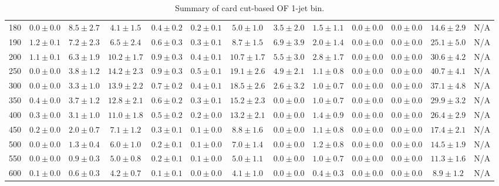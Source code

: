 \begin{table}
{\begin{center}
\begin{tabular}{l | c c | c c c c c c c c  | c c}
180 & $0.0\pm0.0$ & $8.5\pm2.7$ & $4.1\pm1.5$ & $0.4\pm0.2$ & $0.2\pm0.1$ & $5.0\pm1.0$ & $3.5\pm2.0$ & $1.5\pm1.1$ & $0.0\pm0.0$ & $0.0\pm0.0$ & $14.6\pm2.9$ & N/A \\
190 & $1.2\pm0.1$ & $7.2\pm2.3$ & $6.5\pm2.4$ & $0.6\pm0.3$ & $0.3\pm0.1$ & $8.7\pm1.5$ & $6.9\pm3.9$ & $2.0\pm1.4$ & $0.0\pm0.0$ & $0.0\pm0.0$ & $25.1\pm5.0$ & N/A \\
200 & $1.1\pm0.1$ & $6.3\pm1.9$ & $10.2\pm1.7$ & $0.9\pm0.3$ & $0.4\pm0.1$ & $10.7\pm1.7$ & $5.5\pm3.0$ & $2.8\pm1.7$ & $0.0\pm0.0$ & $0.0\pm0.0$ & $30.6\pm4.2$ & N/A \\
250 & $0.0\pm0.0$ & $3.8\pm1.2$ & $14.2\pm2.3$ & $0.9\pm0.3$ & $0.5\pm0.1$ & $19.1\pm2.6$ & $4.9\pm2.1$ & $1.1\pm0.8$ & $0.0\pm0.0$ & $0.0\pm0.0$ & $40.7\pm4.1$ & N/A \\
300 & $0.0\pm0.0$ & $3.3\pm1.0$ & $13.9\pm2.2$ & $0.7\pm0.2$ & $0.4\pm0.1$ & $18.5\pm2.6$ & $2.6\pm3.2$ & $1.0\pm0.7$ & $0.0\pm0.0$ & $0.0\pm0.0$ & $37.1\pm4.8$ & N/A \\
350 & $0.4\pm0.0$ & $3.7\pm1.2$ & $12.8\pm2.1$ & $0.6\pm0.2$ & $0.3\pm0.1$ & $15.2\pm2.3$ & $0.0\pm0.0$ & $1.0\pm0.7$ & $0.0\pm0.0$ & $0.0\pm0.0$ & $29.9\pm3.2$ & N/A \\
400 & $0.3\pm0.0$ & $3.1\pm1.0$ & $11.0\pm1.8$ & $0.5\pm0.2$ & $0.2\pm0.0$ & $13.2\pm2.1$ & $0.0\pm0.0$ & $1.4\pm0.9$ & $0.0\pm0.0$ & $0.0\pm0.0$ & $26.4\pm2.9$ & N/A \\
450 & $0.2\pm0.0$ & $2.0\pm0.7$ & $7.1\pm1.2$ & $0.3\pm0.1$ & $0.1\pm0.0$ & $8.8\pm1.6$ & $0.0\pm0.0$ & $1.1\pm0.8$ & $0.0\pm0.0$ & $0.0\pm0.0$ & $17.4\pm2.1$ & N/A \\
500 & $0.0\pm0.0$ & $1.3\pm0.4$ & $6.0\pm1.0$ & $0.2\pm0.1$ & $0.1\pm0.0$ & $7.0\pm1.4$ & $0.0\pm0.0$ & $1.2\pm0.8$ & $0.0\pm0.0$ & $0.0\pm0.0$ & $14.5\pm1.9$ & N/A \\
550 & $0.0\pm0.0$ & $0.9\pm0.3$ & $5.0\pm0.8$ & $0.2\pm0.1$ & $0.1\pm0.0$ & $5.0\pm1.1$ & $0.0\pm0.0$ & $1.0\pm0.7$ & $0.0\pm0.0$ & $0.0\pm0.0$ & $11.3\pm1.6$ & N/A \\
600 & $0.1\pm0.0$ & $0.6\pm0.3$ & $4.2\pm0.7$ & $0.1\pm0.1$ & $0.0\pm0.0$ & $4.1\pm1.0$ & $0.0\pm0.0$ & $0.4\pm0.3$ & $0.0\pm0.0$ & $0.0\pm0.0$ & $8.9\pm1.2$ & N/A \\
\hline
\end{tabular}
\end{center}
}
\caption{Summary of card cut-based OF 1-jet bin.}
\end{table}
